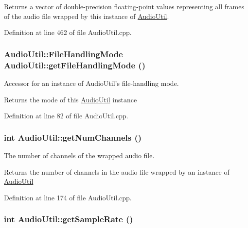 \begin{DoxyReturn}{Returns}
a vector of double-\/precision floating-\/point values representing all frames of the audio file wrapped by this instance of \hyperlink{classAudioUtil}{AudioUtil}. 
\end{DoxyReturn}


Definition at line 462 of file AudioUtil.cpp.\hypertarget{classAudioUtil_af2e6ba95a82a2a28cb880247e22b9e64}{
\subsubsection[{getFileHandlingMode}]{\setlength{\rightskip}{0pt plus 5cm}AudioUtil::FileHandlingMode AudioUtil::getFileHandlingMode ()}}
\label{classAudioUtil_af2e6ba95a82a2a28cb880247e22b9e64}


Accessor for an instance of AudioUtil's file-\/handling mode. \begin{DoxyReturn}{Returns}
the mode of this \hyperlink{classAudioUtil}{AudioUtil} instance 
\end{DoxyReturn}


Definition at line 82 of file AudioUtil.cpp.\hypertarget{classAudioUtil_ab426f4ff941e0e7eeb68c2c1eb0cb333}{
\subsubsection[{getNumChannels}]{\setlength{\rightskip}{0pt plus 5cm}int AudioUtil::getNumChannels ()}}
\label{classAudioUtil_ab426f4ff941e0e7eeb68c2c1eb0cb333}


The number of channels of the wrapped audio file. \begin{DoxyReturn}{Returns}
the number of channels in the audio file wrapped by an instance of \hyperlink{classAudioUtil}{AudioUtil} 
\end{DoxyReturn}


Definition at line 174 of file AudioUtil.cpp.\hypertarget{classAudioUtil_afd587ae3381e94d76e826e76d2a38378}{
\subsubsection[{getSampleRate}]{\setlength{\rightskip}{0pt plus 5cm}int AudioUtil::getSampleRate ()}}
\label{classAudioUtil_afd587ae3381e94d76e826e76d2a38378}


